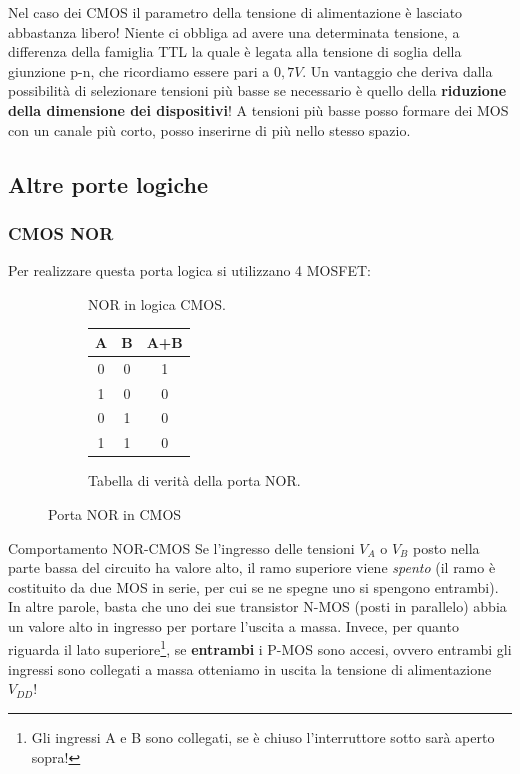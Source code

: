 \documentclass[
]{book}
\begin{document}
Nel caso dei CMOS il parametro della tensione di alimentazione è
lasciato abbastanza libero! Niente ci obbliga ad avere una determinata
tensione, a differenza della famiglia TTL la quale è legata alla
tensione di soglia della giunzione p-n, che ricordiamo essere pari a
\(0,7V\). Un vantaggio che deriva dalla possibilità di selezionare
tensioni più basse se necessario è quello della \textbf{riduzione della
dimensione dei dispositivi}! A tensioni più basse posso formare dei MOS
con un canale più corto, posso inserirne di più nello stesso spazio.

\subsection{Altre porte logiche}\label{altre-porte-logiche}

\subsubsection{CMOS NOR}\label{cmos-nor}

Per realizzare questa porta logica si utilizzano 4 MOSFET:

\begin{figure}[H] 
\centering
\begin{subfigure}{.45\textwidth}

\caption{NOR in logica CMOS.}
\label{fig:subfig1}
\end{subfigure}
\hspace*{\fill}
\begin{subfigure}{.45\textwidth}
\centering
\begin{tabular}{c|c|c}
A & B & A+B  \\ 
\hline
0 & 0 & 1    \\
1 & 0 & 0    \\
0 & 1 & 0    \\
1 & 1 & 0   
\end{tabular}
\caption{Tabella di verità della porta NOR.}
\label{fig:subfig2}\vfill
\end{subfigure}
\caption{Porta NOR in CMOS}
\end{figure}

\begin{redbox}{Comportamento NOR-CMOS}
Se l'ingresso delle tensioni $V_A$ o $V_{B}$ posto nella parte bassa del circuito ha valore alto, il ramo superiore viene \emph{spento} (il ramo è costituito da due MOS in serie, per cui se ne spegne uno si spengono entrambi). In altre parole, basta che uno dei sue transistor N-MOS (posti in parallelo) abbia un valore alto in ingresso per portare l'uscita a massa.
\newline
Invece, per quanto riguarda il lato superiore\footnote{Gli ingressi A e B sono collegati, se è chiuso l'interruttore sotto sarà aperto sopra!}, se \textbf{entrambi} i P-MOS sono accesi, ovvero entrambi gli ingressi sono collegati a massa otteniamo in uscita la tensione di alimentazione $V_{DD}$!
\end{redbox}
\end{document}
